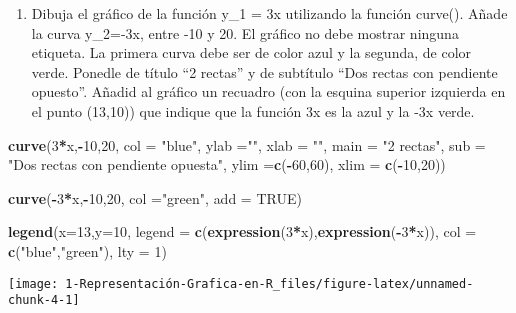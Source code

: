 \documentclass[
]{article}
\newenvironment{Shaded}{\begin{snugshade}}{\end{snugshade}}
\newcommand{\DataTypeTok}[1]{\textcolor[rgb]{0.13,0.29,0.53}{#1}}
\newcommand{\DecValTok}[1]{\textcolor[rgb]{0.00,0.00,0.81}{#1}}
\newcommand{\KeywordTok}[1]{\textcolor[rgb]{0.13,0.29,0.53}{\textbf{#1}}}
\newcommand{\NormalTok}[1]{#1}
\newcommand{\OperatorTok}[1]{\textcolor[rgb]{0.81,0.36,0.00}{\textbf{#1}}}
\newcommand{\OtherTok}[1]{\textcolor[rgb]{0.56,0.35,0.01}{#1}}
\newcommand{\StringTok}[1]{\textcolor[rgb]{0.31,0.60,0.02}{#1}}
\providecommand{\tightlist}{%
  \setlength{\itemsep}{0pt}\setlength{\parskip}{0pt}}
\begin{document}
\begin{enumerate}
\def\labelenumi{\arabic{enumi}.}
\setcounter{enumi}{3}
\tightlist
\item
  Dibuja el gráfico de la función y\_1 = 3x utilizando la función
  curve(). Añade la curva y\_2=-3x, entre -10 y 20. El gráfico no debe
  mostrar ninguna etiqueta. La primera curva debe ser de color azul y la
  segunda, de color verde. Ponedle de título ``2 rectas'' y de subtítulo
  ``Dos rectas con pendiente opuesto''. Añadid al gráfico un recuadro
  (con la esquina superior izquierda en el punto (13,10)) que indique
  que la función 3x es la azul y la -3x verde.
\end{enumerate}

\begin{Shaded}
\begin{Highlighting}[]
\KeywordTok{curve}\NormalTok{(}\DecValTok{3}\OperatorTok{*}\NormalTok{x,}\OperatorTok{-}\DecValTok{10}\NormalTok{,}\DecValTok{20}\NormalTok{, }\DataTypeTok{col =} \StringTok{"blue"}\NormalTok{,}
      \DataTypeTok{ylab =}\StringTok{""}\NormalTok{, }\DataTypeTok{xlab =} \StringTok{""}\NormalTok{,}
      \DataTypeTok{main =} \StringTok{"2 rectas"}\NormalTok{, }
      \DataTypeTok{sub =} \StringTok{"Dos rectas con pendiente opuesta"}\NormalTok{,}
      \DataTypeTok{ylim =}\KeywordTok{c}\NormalTok{(}\OperatorTok{-}\DecValTok{60}\NormalTok{,}\DecValTok{60}\NormalTok{),}
      \DataTypeTok{xlim =} \KeywordTok{c}\NormalTok{(}\OperatorTok{-}\DecValTok{10}\NormalTok{,}\DecValTok{20}\NormalTok{))}

\KeywordTok{curve}\NormalTok{(}\OperatorTok{-}\DecValTok{3}\OperatorTok{*}\NormalTok{x,}\OperatorTok{-}\DecValTok{10}\NormalTok{,}\DecValTok{20}\NormalTok{, }\DataTypeTok{col =}\StringTok{"green"}\NormalTok{,}
      \DataTypeTok{add =} \OtherTok{TRUE}\NormalTok{)}

\KeywordTok{legend}\NormalTok{(}\DataTypeTok{x=}\DecValTok{13}\NormalTok{,}\DataTypeTok{y=}\DecValTok{10}\NormalTok{,}
       \DataTypeTok{legend =} \KeywordTok{c}\NormalTok{(}\KeywordTok{expression}\NormalTok{(}\DecValTok{3}\OperatorTok{*}\NormalTok{x),}\KeywordTok{expression}\NormalTok{(}\OperatorTok{-}\DecValTok{3}\OperatorTok{*}\NormalTok{x)),}
       \DataTypeTok{col =} \KeywordTok{c}\NormalTok{(}\StringTok{"blue"}\NormalTok{,}\StringTok{"green"}\NormalTok{),}
       \DataTypeTok{lty =} \DecValTok{1}\NormalTok{)}
\end{Highlighting}
\end{Shaded}

\begin{center}\texttt{[image: 1-Representación-Grafica-en-R\_files/figure-latex/unnamed-chunk-4-1]} \end{center}
\end{document}
